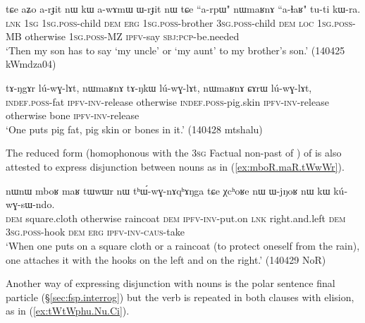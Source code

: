 \begin{exe}
\ex \label{ex:arpW.nWmaRnA}
 \gll tɕe aʑo a-rɟit nɯ kɯ a-wɤmɯ ɯ-rɟit nɯ tɕe ``a-rpɯ" nɯmaʁnɤ ``a-ɬaʁ" tu-ti kɯ-ra. \\
 \textsc{lnk} \textsc{1sg} \textsc{1sg}.\textsc{poss}-child \textsc{dem} \textsc{erg} \textsc{1sg}.\textsc{poss}-brother \textsc{3sg}.\textsc{poss}-child \textsc{dem} \textsc{loc} \textsc{1sg}.\textsc{poss}-MB otherwise \textsc{1sg}.\textsc{poss}-MZ \textsc{ipfv}-say \textsc{sbj}:\textsc{pcp}-be.needed \\
\glt `Then my son has to say `my uncle' or `my aunt' to my brother's son.'  (140425 kWmdza04)
 \end{exe}
 
 \begin{exe}
\ex \label{ex:luwɣlAt.nWmaRnA}
 \gll  tɤ-ŋgɤr lú-wɣ-lɤt, nɯmaʁnɤ tɤ-ŋkɯ lú-wɣ-lɤt, nɯmaʁnɤ ɕɤrɯ lú-wɣ-lɤt, \\
 \textsc{indef}.\textsc{poss}-fat \textsc{ipfv}-\textsc{inv}-release otherwise  \textsc{indef}.\textsc{poss}-pig.skin  \textsc{ipfv}-\textsc{inv}-release otherwise bone \textsc{ipfv}-\textsc{inv}-release \\
\glt `One puts pig fat, pig skin or bones in it.' (140428 mtshalu) 	
 \end{exe}

The reduced form  (homophonous with the \textsc{3sg} Factual non-past of ) of   is also attested to express disjunction between nouns as in (\ref{ex:mboR.maR.tWwWr}).

 \begin{exe}
\ex \label{ex:mboR.maR.tWwWr}
 \gll  nɯnɯ mboʁ maʁ tɯwɯr nɯ tʰɯ́-wɣ-nɤqʰɤŋga tɕe χcʰoʁe nɯ ɯ-jŋoʁ nɯ kɯ kú-wɣ-sɯ-ndo. \\
 \textsc{dem} square.cloth otherwise raincoat \textsc{dem} \textsc{ipfv}-\textsc{inv}-put.on \textsc{lnk} right.and.left \textsc{dem} \textsc{3sg}.\textsc{poss}-hook \textsc{dem} \textsc{erg} \textsc{ipfv}-\textsc{inv}-\textsc{caus}-take \\
 \glt `When one puts on a square cloth or a raincoat (to protect oneself from the rain), one attaches it with the hooks on the left and on the right.' (140429 NoR)
  \end{exe}

Another way of expressing disjunction with nouns is the polar sentence final particle  (§\ref{sec:fsp.interrog}) but the verb is repeated in both clauses with elision, as in (\ref{ex:tWtWphu.Nu.Ci}).

